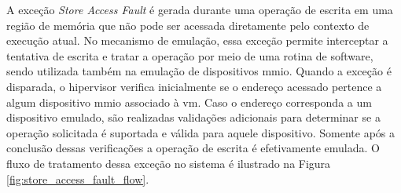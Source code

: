 A exceção \textit{Store Access Fault} é gerada durante uma operação de escrita em uma região de memória que não pode ser acessada diretamente pelo contexto de execução atual.
No mecanismo de emulação, essa exceção permite interceptar a tentativa de escrita e tratar a operação por meio de uma rotina de software, sendo
utilizada também na emulação de dispositivos \gls{mmio}.
Quando a exceção é disparada, o hipervisor verifica inicialmente se o endereço acessado pertence a algum dispositivo \gls{mmio} associado à \gls{vm}.
Caso o endereço corresponda a um dispositivo emulado, são realizadas validações adicionais para determinar se a operação solicitada é suportada e válida para aquele dispositivo.
Somente após a conclusão dessas verificações a operação de escrita é efetivamente emulada. O fluxo de tratamento dessa exceção no sistema é ilustrado na Figura \ref{fig:store_access_fault_flow}.

\vspace{1cm}

